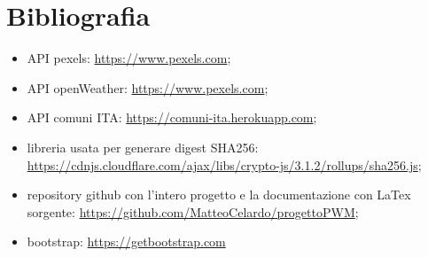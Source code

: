 \chapter{Bibliografia}

\begin{itemize}
    \item API pexels: \url{https://www.pexels.com};
    \item API openWeather: \url{https://www.pexels.com};
    \item API comuni ITA: \url{https://comuni-ita.herokuapp.com};
    \item libreria usata per generare digest SHA256: \url{https://cdnjs.cloudflare.com/ajax/libs/crypto-js/3.1.2/rollups/sha256.js};
    \item repository github con l'intero progetto e la documentazione con LaTex sorgente: \url{https://github.com/MatteoCelardo/progettoPWM};
    \item bootstrap: \url{https://getbootstrap.com}
\end{itemize}